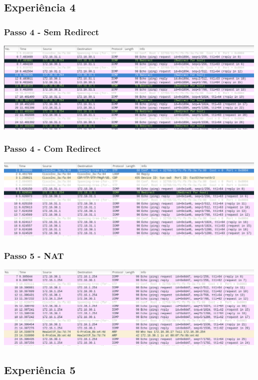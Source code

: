 \documentclass[a4paper]{article}
\begin{document}
\subsection{Experiência 4}
\subsubsection{Passo 4 - Sem Redirect}

\includegraphics[scale=0.35]{Exp4-4-withoutRedirect.png}

\subsubsection{Passo 4 - Com Redirect}

\includegraphics[scale=0.35]{Exp4-4-withRedirect.png}

\subsubsection{Passo 5 - NAT}

\includegraphics[scale=0.35]{Exp4-5-NAT.png}

\subsection{Experiência 5}
\end{document}
